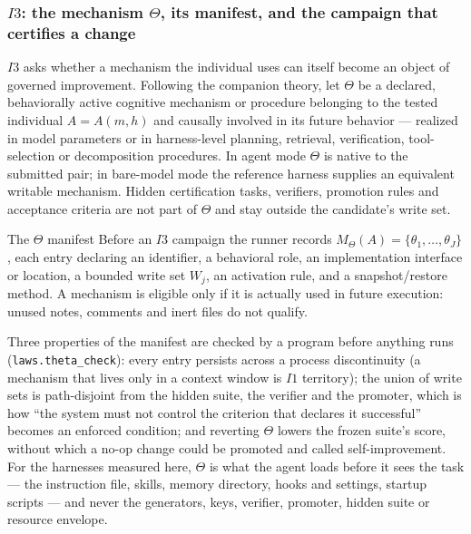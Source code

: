 \subsubsection{$I3$: the mechanism $\Theta$, its manifest, and the campaign that certifies a change}\label{sec:i3}

$I3$ asks whether a mechanism the individual uses can itself become an object of governed improvement. Following the companion theory, let $\Theta$ be a declared, behaviorally active cognitive mechanism or procedure belonging to the tested individual $A=A(m,h)$ and causally involved in its future behavior --- realized in model parameters or in harness-level planning, retrieval, verification, tool-selection or decomposition procedures. In agent mode $\Theta$ is native to the submitted pair; in bare-model mode the reference harness supplies an equivalent writable mechanism. Hidden certification tasks, verifiers, promotion rules and acceptance criteria are not part of $\Theta$ and stay outside the candidate's write set.

\begin{claimbox}{The $\Theta$ manifest}
Before an $I3$ campaign the runner records $M_\Theta(A) = \{\theta_1, \ldots, \theta_J\}$, each entry declaring an identifier, a behavioral role, an implementation interface or location, a bounded write set $W_j$, an activation rule, and a snapshot/restore method. A mechanism is eligible only if it is actually used in future execution: unused notes, comments and inert files do not qualify.
\end{claimbox}

Three properties of the manifest are checked by a program before anything runs (\texttt{laws.theta\_check}): every entry persists across a process discontinuity (a mechanism that lives only in a context window is $I1$ territory); the union of write sets is path-disjoint from the hidden suite, the verifier and the promoter, which is how ``the system must not control the criterion that declares it successful'' becomes an enforced condition; and reverting $\Theta$ lowers the frozen suite's score, without which a no-op change could be promoted and called self-improvement. For the harnesses measured here, $\Theta$ is what the agent loads before it sees the task --- the instruction file, skills, memory directory, hooks and settings, startup scripts --- and never the generators, keys, verifier, promoter, hidden suite or resource envelope.

